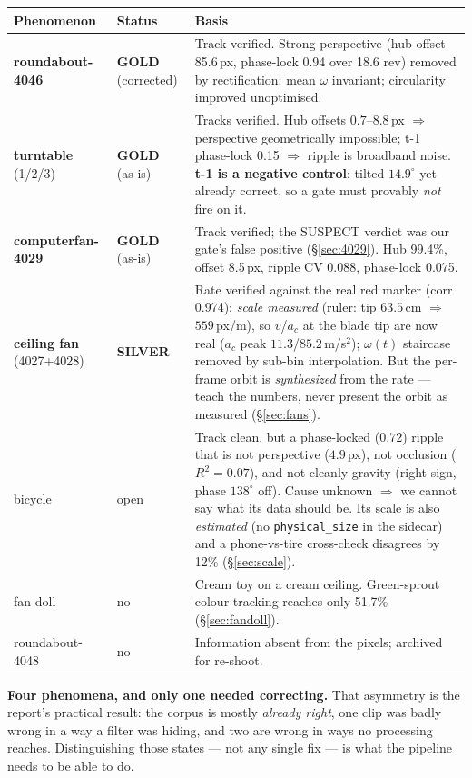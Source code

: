 \documentclass[11pt,a4paper]{article}
\begin{document}
\begin{center}
\begin{tabular}{llp{7.4cm}}
\toprule
Phenomenon & Status & Basis \\
\midrule
\textbf{roundabout-4046} & \textbf{GOLD} (corrected) & Track verified. Strong perspective
(hub offset 85.6\,px, phase-lock 0.94 over 18.6 rev) removed by rectification; mean $\omega$
invariant; circularity improved unoptimised. \\
\textbf{turntable} (1/2/3) & \textbf{GOLD} (as-is) & Tracks verified. Hub offsets
$0.7$--$8.8$\,px $\Rightarrow$ perspective geometrically impossible; t-1 phase-lock 0.15
$\Rightarrow$ ripple is broadband noise. \textbf{t-1 is a negative control}: tilted $14.9^\circ$
yet already correct, so a gate must provably \emph{not} fire on it. \\
\textbf{computerfan-4029} & \textbf{GOLD} (as-is) & Track verified; the SUSPECT verdict was our
gate's false positive (\S\ref{sec:4029}). Hub 99.4\%, offset 8.5\,px, ripple CV 0.088,
phase-lock 0.075. \\
\textbf{ceiling fan} (4027+4028) & \textbf{SILVER} & Rate verified against the real red marker
(corr 0.974); \emph{scale measured} (ruler: tip $63.5$\,cm $\Rightarrow$ $559$\,px/m), so $v$/$a_c$
at the blade tip are now real ($a_c$ peak $11.3$/$85.2$\,m/s$^2$); $\omega(t)$ staircase removed by
sub-bin interpolation. But the per-frame orbit is \emph{synthesized} from the rate --- teach the
numbers, never present the orbit as measured (\S\ref{sec:fans}). \\
\midrule
bicycle & \textcolor{warn}{open} & Track clean, but a phase-locked ($0.72$) ripple that is not
perspective ($4.9$\,px), not occlusion ($R^2 = 0.07$), and not cleanly gravity (right sign,
phase $138^\circ$ off). Cause unknown $\Rightarrow$ we cannot say what its data should be. Its
scale is also \emph{estimated} (no \texttt{physical\_size} in the sidecar) and a phone-vs-tire
cross-check disagrees by 12\% (\S\ref{sec:scale}). \\
fan-doll & \textcolor{bad}{no} & Cream toy on a cream ceiling. Green-sprout colour tracking
reaches only 51.7\% (\S\ref{sec:fandoll}). \\
roundabout-4048 & \textcolor{bad}{no} & Information absent from the pixels; archived for
re-shoot. \\
\bottomrule
\end{tabular}
\end{center}

\textbf{Four phenomena, and only one needed correcting.} That asymmetry is the report's
practical result: the corpus is mostly \emph{already right}, one clip was badly wrong in a way a
filter was hiding, and two are wrong in ways no processing reaches. Distinguishing those states
--- not any single fix --- is what the pipeline needs to be able to do.
\end{document}
